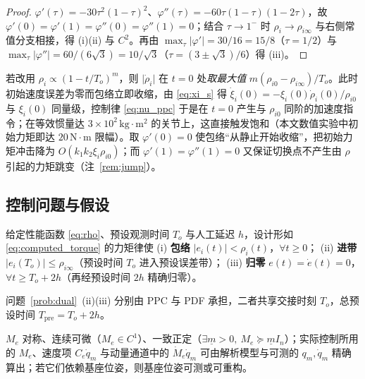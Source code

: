 \begin{proof}
\(\varphi'(\tau)=-30\tau^{2}(1-\tau)^{2}\)、\(\varphi''(\tau)=-60\tau(1-\tau)(1-2\tau)\)，故 \(\varphi'(0)=\varphi'(1)=\varphi''(0)=\varphi''(1)=0\)；结合 \(\tau\to1^{-}\) 时 \(\rho_i\to\rho_{i\infty}\) 与右侧常值分支相接，得 (i)(ii) 与 \(C^{2}\)。再由 \(\max_{\tau}\lvert\varphi'\rvert=30/16=15/8\)（\(\tau=1/2\)）与 \(\max_{\tau}\lvert\varphi''\rvert=60/(6\sqrt3)=10/\sqrt3\)（\(\tau=(3\pm\sqrt3)/6\)）得 (iii)。
\end{proof}

\begin{remark}[为什么取 \(\dot\rho_i(0)=0\)]\label{rem:rho_zero_slope}
若改用 \(\rho_i\propto(1-t/T_o)^{m}\)，则 \(\lvert\dot\rho_i\rvert\) 在 \(t=0\) 处\emph{取最大值} \(m(\rho_{i0}-\rho_{i\infty})/T_o\)。此时初始速度误差为零而包络立即收缩，由 \eqref{eq:xi_s} 得 \(\dot\xi_i(0)=-\xi_i(0)\dot\rho_i(0)/\rho_{i0}\) 与 \(\xi_i(0)\) 同量级，控制律 \eqref{eq:nu_ppc} 于是在 \(t=0\) 产生与 \(\rho_{i0}\) 同阶的加速度指令；在等效惯量达 \(3\times10^{2}\,\mathrm{kg\cdot m^2}\) 的关节上，这直接触发饱和（本文数值实验中初始力矩即达 \(20\,\mathrm{N\cdot m}\) 限幅）。取 \(\varphi'(0)=0\) 使包络“从静止开始收缩”，把初始力矩冲击降为 \(O(k_1k_2\xi_i\rho_{i0})\)；而 \(\varphi'(1)=\varphi''(1)=0\) 又保证切换点不产生由 \(\rho\) 引起的力矩跳变（注~\ref{rem:jump}）。
\end{remark}

\subsection{控制问题与假设}
\label{sec:problem}

\begin{problem}[双重预设跟踪]\label{prob:dual}
给定性能函数 \eqref{eq:rho}、预设观测时间 \(T_o\) 与人工延迟 \(h\)，设计形如 \eqref{eq:computed_torque} 的力矩律使
\textup{(i)} \textbf{包络} \(\lvert e_i(t)\rvert<\rho_i(t)\)，\(\forall t\ge0\)；
\textup{(ii)} \textbf{进带} \(\lvert e_i(T_o)\rvert\le\rho_{i\infty}\)（预设时间 \(T_o\) 进入预设误差带）；
\textup{(iii)} \textbf{归零} \(e(t)=\dot e(t)=0\)，\(\forall t\ge T_o+2h\)（再经预设时间 \(2h\) 精确归零）。
\end{problem}

问题~\ref{prob:dual}~(ii)(iii) 分别由 PPC 与 PDF 承担，二者共享交接时刻 \(T_o\)，总预设时间 \(T_{\mathrm{pre}}=T_o+2h\)。

\begin{assumption}[模型与惯性]\label{as:inertia}
\(M_e\) 对称、连续可微（\(M_e\in C^{1}\)）、一致正定（\(\exists\underline m>0,\ M_e\succeq\underline m I_n\)）；实际控制所用的 \(M_e\)、速度项 \(C_e\dot q_m\) 与动量通道中的 \(\dot M_e\dot q_m\) 可由解析模型与可测的 \(q_m,\dot q_m\) 精确算出；若它们依赖基座位姿，则基座位姿可测或可重构。
\end{assumption}

